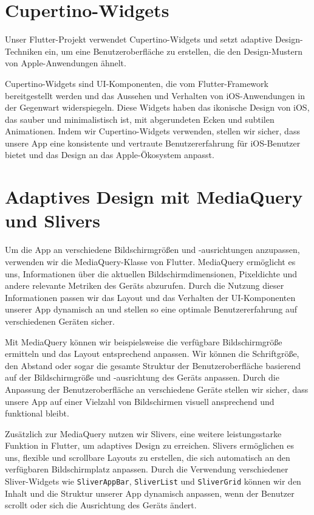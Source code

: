 \section{Cupertino-Widgets}
Unser Flutter-Projekt verwendet Cupertino-Widgets und setzt adaptive Design-Techniken ein, um eine Benutzeroberfläche zu erstellen, 
die den Design-Mustern von Apple-Anwendungen ähnelt.

Cupertino-Widgets sind UI-Komponenten, die vom Flutter-Framework bereitgestellt werden und das Aussehen und Verhalten von 
iOS-Anwendungen in der Gegenwart widerspiegeln. Diese Widgets haben das ikonische Design von iOS, das sauber und minimalistisch ist, 
mit abgerundeten Ecken und subtilen Animationen. Indem wir Cupertino-Widgets verwenden, stellen wir sicher, 
dass unsere App eine konsistente und vertraute Benutzererfahrung für iOS-Benutzer bietet und das Design an das Apple-Ökosystem anpasst.

\section{Adaptives Design mit MediaQuery und Slivers}
Um die App an verschiedene Bildschirmgrößen und -ausrichtungen anzupassen, verwenden wir die MediaQuery-Klasse von Flutter. 
MediaQuery ermöglicht es uns, Informationen über die aktuellen Bildschirmdimensionen, Pixeldichte und andere relevante Metriken des Geräts abzurufen. 
Durch die Nutzung dieser Informationen passen wir das Layout und das Verhalten der UI-Komponenten unserer App 
dynamisch an und stellen so eine optimale Benutzererfahrung auf verschiedenen Geräten sicher.

Mit MediaQuery können wir beispielsweise die verfügbare Bildschirmgröße ermitteln und das Layout entsprechend anpassen. 
Wir können die Schriftgröße, den Abstand oder sogar die gesamte Struktur der Benutzeroberfläche basierend auf der Bildschirmgröße und -ausrichtung des Geräts anpassen. 
Durch die Anpassung der Benutzeroberfläche an verschiedene Geräte stellen wir sicher, dass unsere App auf einer Vielzahl von Bildschirmen visuell ansprechend und funktional bleibt.

Zusätzlich zur MediaQuery nutzen wir Slivers, eine weitere leistungsstarke Funktion in Flutter, um adaptives Design zu erreichen. 
Slivers ermöglichen es uns, flexible und scrollbare Layouts zu erstellen, die sich automatisch an den verfügbaren Bildschirmplatz anpassen. 
Durch die Verwendung verschiedener Sliver-Widgets wie \texttt{SliverAppBar}, \texttt{SliverList} und \texttt{SliverGrid} können wir den Inhalt und die Struktur unserer App dynamisch anpassen, 
wenn der Benutzer scrollt oder sich die Ausrichtung des Geräts ändert.

